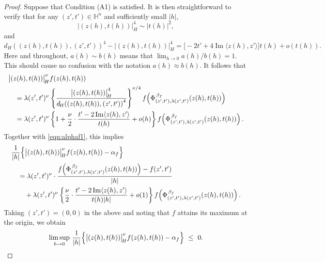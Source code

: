 \documentclass[reqno]{amsart}
\theoremstyle{definition}
\theoremstyle{remark}
\numberwithin{equation}{section}
\begin{document}
\begin{proof}
Suppose that Condition (A1) is satisfied. It is then straightforward to verify that for any $(z', t') \in \mathbb{H}^n$ and sufficiently small $|h|$, 
\[
\bigl|(z(h),t(h)) \bigr|_{\! H}^4 \sim |t(h)|^2,
\]
and
\[
d_{\! H} \!\left((z(h), t(h)), (z', t')\right)^4 - \bigl|(z(h),t(h)) \bigr|_{\! H}^4
= \bigl[ -2t' + 4 \operatorname{Im} \langle z(h), z' \rangle \bigr] t(h) + o(t(h)).
\]
Here and throughout, $a(h) \sim b(h)$ means that $\lim_{h\to 0} a(h)/b(h) =1$. 
This should cause no confusion with the notation $a(h) \approx b(h)$.
It follows that
\begin{align}
& \bigl|(z(h), t(h)) \bigr|_{\! H}^{\nu} f(z(h), t(h)) \notag \\
&\quad = \lambda(z', t')^{\nu} \left\{ \frac{\bigl|(z(h),t(h)) \bigr|_{\! H}^4}{d_{\! H} \!\left((z(h), t(h)), (z', t')\right)^4} \right\}^{\nu/4} 
f \!\left( \Phi_{(z', t'), \lambda(z', t')}^{\, \beta_f} (z(h), t(h)) \right) \notag \\
&\quad = \lambda(z', t')^{\nu} \left\{ 1 + \frac{\nu}{2} \cdot \frac{t' - 2 \operatorname{Im} \langle z(h), z' \rangle}{t(h)} + o(h) \right\}
f \!\left( \Phi_{(z', t'), \lambda(z', t')}^{\, \beta_f} (z(h), t(h)) \right). \notag
\end{align}
Together with \eqref{eqn:alphaf1}, this implies
\begin{align}
& \frac{1}{|h|} \Bigl\{ \bigl|(z(h),t(h)) \bigr|_{\! H}^{\nu} f(z(h), t(h)) - \alpha_f \Bigr\} \notag \\
&\quad = \lambda(z', t')^{\nu} \cdot \frac{ f \!\left( \Phi_{(z', t'), \lambda(z', t')}^{\, \beta_f}
(z(h), t(h)) \right) - f(z', t') }{|h|} \notag \\
&\qquad + \lambda(z', t')^{\nu} \left\{ \frac{\nu}{2} \cdot \frac{t' - 2 \operatorname{Im} \langle z(h), z' \rangle}{t(h) |h|} + o(1) \right\}
f \!\left( \Phi_{(z', t'), \lambda(z', t')}^{\, \beta_f} (z(h), t(h)) \right). \label{eqn:asym02}
\end{align}
Taking $(z', t') = (0, 0)$ in the above and noting that $f$ attains its maximum at the origin, we obtain
\begin{equation}
\limsup_{h \to 0} \, \frac{1}{|h|} \Bigl\{ \bigl|(z(h),t(h)) \bigr|_{\! H}^{\nu} f(z(h), t(h)) - \alpha_f 
\Bigr\} ~\leq~ 0.
\end{equation}


\end{proof}
\end{document}
